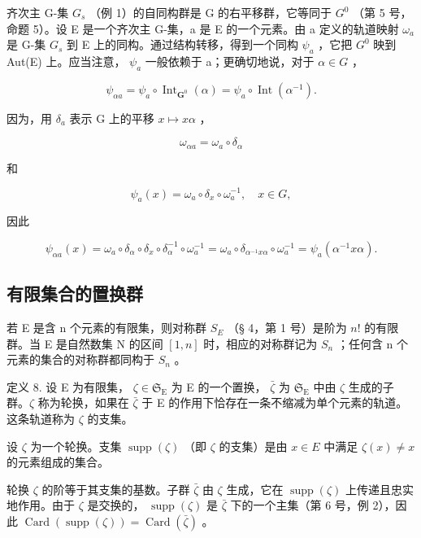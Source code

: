 齐次主 G-集 \(G_{s}\) （例 1）的自同构群是 G 的右平移群，它等同于 \(G^{0}\) （第 5 号，命题 5）。设 E 是一个齐次主 G-集，a 是 E 的一个元素。由 a 定义的轨道映射 \(\omega_{a}\) 是 G-集 \(G_{s}\) 到 E 上的同构。通过结构转移，得到一个同构 \(\psi_{a}\) ，它把 \(G^{0}\) 映到 Aut(E) 上。应当注意， \(\psi_{a}\) 一般依赖于 a；更确切地说，对于 \(\alpha \in G\) ，

\[
\psi_ {\alpha a} = \psi_ {a} \circ \operatorname{Int} _ {\mathbf {G} ^ {0}} (\alpha) = \psi_ {a} \circ \operatorname{Int} (\alpha^ {- 1}).\tag{3}
\]

因为，用 \(\delta_{a}\) 表示 G 上的平移 \(x\mapsto x\alpha\) ，

\[
\omega_ {\alpha a} = \omega_ {a} \circ \delta_ {\alpha}
\]

和

\[
\psi_ {a} (x) = \omega_ {a} \circ \delta_ {x} \circ \omega_ {a} ^ {- 1}, \quad x \in G,
\]

因此

\[
\psi_ {\alpha a} (x) = \omega_ {a} \circ \delta_ {\alpha} \circ \delta_ {x} \circ \delta_ {\alpha} ^ {- 1} \circ \omega_ {a} ^ {- 1} = \omega_ {a} \circ \delta_ {\alpha^ {- 1} x \alpha} \circ \omega_ {a} ^ {- 1} = \psi_ {a} (\alpha^ {- 1} x \alpha).
\]

\subsection{有限集合的置换群}

若 E 是含 n 个元素的有限集，则对称群 \(S_{E}\) （§ 4，第 1 号）是阶为 \(n!\) 的有限群。当 E 是自然数集 N 的区间 \([1, n]\) 时，相应的对称群记为 \(S_{n}\) ；任何含 n 个元素的集合的对称群都同构于 \(S_{n}\) 。

定义 8. 设 E 为有限集， \(\zeta \in \mathfrak{S}_{\mathrm{E}}\) 为 E 的一个置换， \(\bar{\zeta}\) 为 \(\mathfrak{S}_{\mathrm{E}}\) 中由 \(\zeta\) 生成的子群。\(\zeta\) 称为轮换，如果在 \(\bar{\zeta}\) 于 E 的作用下恰存在一条不缩减为单个元素的轨道。这条轨道称为 \(\zeta\) 的支集。

设 \(\zeta\) 为一个轮换。支集 \(\operatorname{supp}(\zeta)\) （即 \(\zeta\) 的支集）是由 \(x \in E\) 中满足 \(\zeta(x) \neq x\) 的元素组成的集合。

轮换 \(\zeta\) 的阶等于其支集的基数。子群 \(\bar{\zeta}\) 由 \(\zeta\) 生成，它在 \(\operatorname{supp}(\zeta)\) 上传递且忠实地作用。由于 \(\zeta\) 是交换的， \(\operatorname{supp}(\zeta)\) 是 \(\bar{\zeta}\) 下的一个主集（第 6 号，例 2），因此 \(\operatorname{Card}(\operatorname{supp}(\zeta)) = \operatorname{Card}(\bar{\zeta})\) 。

